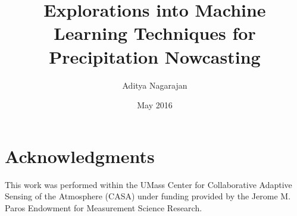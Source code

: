 \documentclass[proposal]{umassthesis}
\begin{document}
\title{Explorations into Machine Learning Techniques for Precipitation Nowcasting}

  
\author{Aditya Nagarajan}
\date{May 2016}
                     


\frontmatter
\maketitle
\signaturepage

\chapter{Acknowledgments}             %
This work was performed within the UMass Center for Collaborative Adaptive Sensing of the Atmosphere (CASA) under funding provided by the Jerome M. Paros Endowment for Measurement Science Research.
\end{document}
